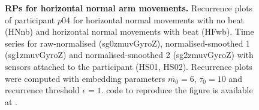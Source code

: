 \begin{figure}
{	{\bf RPs for horizontal normal arm movements.}	
	Recurrence plots of participant $p04$ for 
	horizontal normal movements with no beat (HNnb) and
	horizontal normal movements with beat (HFwb).
	Time series for raw-normalised (sg0zmuvGyroZ), 
	normalised-smoothed 1 (sg1zmuvGyroZ) and 
	normalised-smoothed 2 (sg2zmuvGyroZ) with
	sensors attached to the participant (HS01, HS02).
	Recurrence plots were computed with 
	embedding parameters $\overline{m_0}=6$, $\overline{\tau_0}=10$ and
	recurrence threshold $\epsilon=1$.
		\R code to reproduce the figure is available at 
		.
        }
    \label{fig:rps_HN_w500_p04}
\end{figure}




